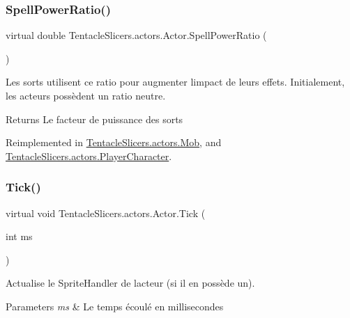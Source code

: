 \subsubsection{\texorpdfstring{Spell\+Power\+Ratio()}{SpellPowerRatio()}}
{\footnotesize\ttfamily virtual double Tentacle\+Slicers.\+actors.\+Actor.\+Spell\+Power\+Ratio (\begin{DoxyParamCaption}{ }\end{DoxyParamCaption})\hspace{0.3cm}{\ttfamily [virtual]}}



Les sorts utilisent ce ratio pour augmenter l\textquotesingle{}impact de leurs effets. Initialement, les acteurs possèdent un ratio neutre. 

\begin{DoxyReturn}{Returns}
Le facteur de puissance des sorts 
\end{DoxyReturn}


Reimplemented in \hyperlink{class_tentacle_slicers_1_1actors_1_1_mob_abdd7f17fd41371465d7f6b56bf91567c}{Tentacle\+Slicers.\+actors.\+Mob}, and \hyperlink{class_tentacle_slicers_1_1actors_1_1_player_character_aaeb9cd192c0caf68ed7aa994ebb6daa6}{Tentacle\+Slicers.\+actors.\+Player\+Character}.

\mbox{\label{class_tentacle_slicers_1_1actors_1_1_actor_a13e48a1ca022ce7c971c77f1354e3daf}} 
\subsubsection{\texorpdfstring{Tick()}{Tick()}}
{\footnotesize\ttfamily virtual void Tentacle\+Slicers.\+actors.\+Actor.\+Tick (\begin{DoxyParamCaption}\item[{int}]{ms }\end{DoxyParamCaption})\hspace{0.3cm}{\ttfamily [virtual]}}



Actualise le Sprite\+Handler de l\textquotesingle{}acteur (si il en possède un). 


\begin{DoxyParams}{Parameters}
{\em ms} & Le temps écoulé en millisecondes \\
\hline
\end{DoxyParams}


